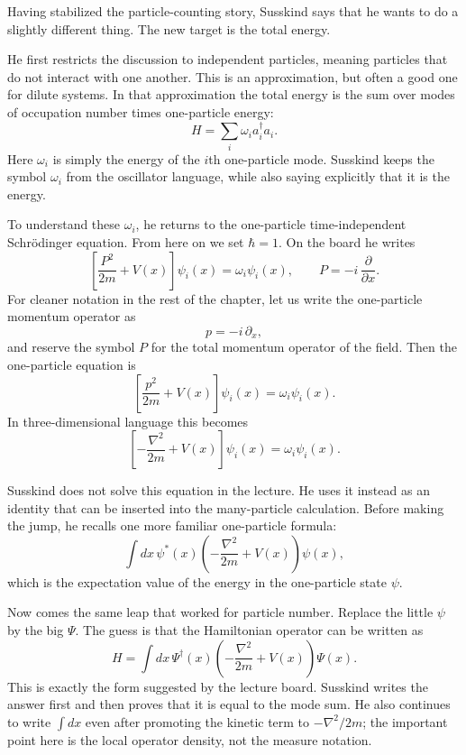 Having stabilized the particle-counting story, Susskind says that he wants to do a slightly different thing. The new target is the total energy.

He first restricts the discussion to independent particles, meaning particles that do not interact with one another. This is an approximation, but often a good one for dilute systems. In that approximation the total energy is the sum over modes of occupation number times one-particle energy:
\begin{equation}
H=\sum_i \omega_i a_i^\dagger a_i.
\end{equation}
Here $\omega_i$ is simply the energy of the $i$th one-particle mode. Susskind keeps the symbol $\omega_i$ from the oscillator language, while also saying explicitly that it is the energy.

To understand these $\omega_i$, he returns to the one-particle time-independent Schr\"odinger equation. From here on we set $\hbar=1$. On the board he writes
\begin{equation}
\left[\frac{P^2}{2m}+V(x)\right]\psi_i(x)=\omega_i\psi_i(x),
\qquad
P=-i\,\frac{\partial}{\partial x}.
\end{equation}
For cleaner notation in the rest of the chapter, let us write the one-particle momentum operator as
\begin{equation}
p=-i\,\partial_x,
\end{equation}
and reserve the symbol $P$ for the total momentum operator of the field. Then the one-particle equation is
\begin{equation}
\left[\frac{p^2}{2m}+V(x)\right]\psi_i(x)=\omega_i\psi_i(x).
\end{equation}
In three-dimensional language this becomes
\begin{equation}
\left[-\frac{\nabla^2}{2m}+V(x)\right]\psi_i(x)=\omega_i\psi_i(x).
\end{equation}

Susskind does not solve this equation in the lecture. He uses it instead as an identity that can be inserted into the many-particle calculation. Before making the jump, he recalls one more familiar one-particle formula:
\begin{equation}
\int dx\,\psi^*(x)\left(-\frac{\nabla^2}{2m}+V(x)\right)\psi(x),
\end{equation}
which is the expectation value of the energy in the one-particle state $\psi$.

Now comes the same leap that worked for particle number. Replace the little $\psi$ by the big $\Psi$. The guess is that the Hamiltonian operator can be written as
\begin{equation}
H=\int dx\,\Psi^\dagger(x)\left(-\frac{\nabla^2}{2m}+V(x)\right)\Psi(x).
\end{equation}
This is exactly the form suggested by the lecture board. Susskind writes the answer first and then proves that it is equal to the mode sum. He also continues to write $\int dx$ even after promoting the kinetic term to $-\nabla^2/2m$; the important point here is the local operator density, not the measure notation.


